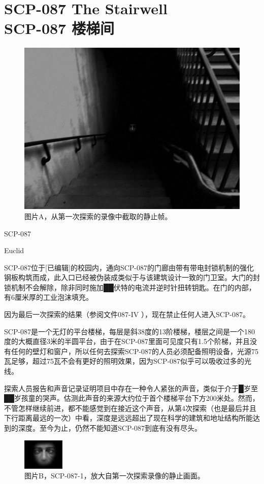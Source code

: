 \chapter[SCP-087 楼梯间]{
    SCP-087 The Stairwell\\
    SCP-087 楼梯间\\
    \heritage
}

\label{chap:SCP-087}

\begin{figure}[H]
    \centering
    \includegraphics[width=0.5\linewidth]{images/SCP.087.png}
    \caption*{图片A，从第一次探索的录像中截取的静止帧。}
\end{figure}

SCP-087

Euclid

SCP-087位于{[}已编辑]的校园内，通向SCP-087的门廊由带有带电封锁机制的强化钢板构筑而成，此入口已经被伪装成类似于与该建筑设计一致的门卫室。大门的封锁机制不会解除，除非同时施加██伏特的电流并逆时针扭转钥匙。在门的内部，有6厘米厚的工业泡沫填充。

因为最后一次探索的结果（参阅文件087-IV ），现在禁止任何人进入SCP-087。

 SCP-087是一个无灯的平台楼梯，每层是斜38度的13阶楼梯，楼层之间是一个180度的大概直径3米的半圆平台，由于在SCP-087里面可见度只有1.5个阶梯，并且没有任何的壁灯和窗户，所以任何去探索SCP-087的人员必须配备照明设备，光源75瓦足够，超过75瓦不会有更好的照明效果，因为SCP-087似乎可以吸收过多的光线。

探索人员报告和声音记录证明项目中存在一种令人紧张的声音，类似于介于█岁至██岁孩童的哭声。估测此声音的来源大约位于首个楼梯平台下方200米处。然而，不管怎样继续前进，都不能感觉到在接近这个声音，从第4次探索（也是最后并且下行距离最远的一次）中看，深度是远远超出了现在科学的建筑和地址结构所能达到的深度。至今为止，仍然不能知道SCP-087到底有没有尽头。

\begin{figure}[H]
    \centering
    \includegraphics[width=0.5\linewidth]{images/SCP.087.2.png}
    \caption*{图片B，SCP-087-1，放大自第一次探索录像的静止画面。}
\end{figure}

